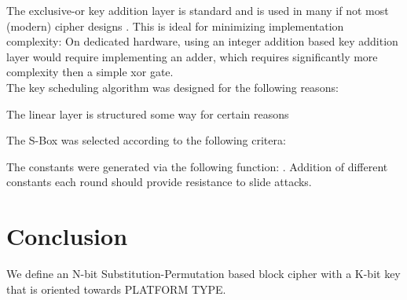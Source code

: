 \documentclass[preprint]{iacrtrans}
\begin{document}
The exclusive-or key addition layer is standard and is used in many if not most (modern) cipher designs  . This is ideal for minimizing implementation complexity: On dedicated hardware, using an integer addition based key addition layer would require implementing an adder, which requires significantly more complexity then a simple xor gate.\\

The key scheduling algorithm was designed for the following reasons: 

The linear layer is structured some way for certain reasons 

The S-Box was selected according to the following critera: 

The constants were generated via the following function: . Addition of different constants each round should provide resistance to slide attacks. 



\section{Conclusion}
 We define an N-bit Substitution-Permutation based block cipher with a K-bit key that is oriented towards PLATFORM TYPE.  
\end{document}
